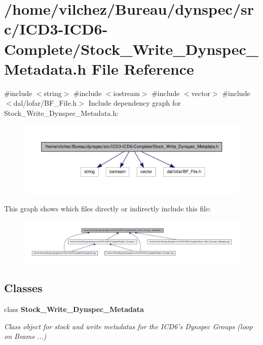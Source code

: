 \section{/home/vilchez/\-Bureau/dynspec/src/\-I\-C\-D3-\/\-I\-C\-D6-\/\-Complete/\-Stock\-\_\-\-Write\-\_\-\-Dynspec\-\_\-\-Metadata.h \-File \-Reference}
\label{_stock___write___dynspec___metadata_8h}
{\ttfamily \#include $<$string$>$}\*
{\ttfamily \#include $<$iostream$>$}\*
{\ttfamily \#include $<$vector$>$}\*
{\ttfamily \#include $<$dal/lofar/\-B\-F\-\_\-\-File.\-h$>$}\*
\-Include dependency graph for \-Stock\-\_\-\-Write\-\_\-\-Dynspec\-\_\-\-Metadata.\-h\-:\nopagebreak
\begin{figure}[H]
\begin{center}
\leavevmode
\includegraphics[width=350pt]{_stock___write___dynspec___metadata_8h__incl}
\end{center}
\end{figure}
\-This graph shows which files directly or indirectly include this file\-:\nopagebreak
\begin{figure}[H]
\begin{center}
\leavevmode
\includegraphics[width=350pt]{_stock___write___dynspec___metadata_8h__dep__incl}
\end{center}
\end{figure}
\subsection*{\-Classes}
\begin{DoxyCompactItemize}
\item 
class {\bf \-Stock\-\_\-\-Write\-\_\-\-Dynspec\-\_\-\-Metadata}
\begin{DoxyCompactList}\small\item\em \-Class object for stock and write metadatas for the \-I\-C\-D6's \-Dynspec \-Groups (loop on \-Beams ...) \end{DoxyCompactList}\end{DoxyCompactItemize}
